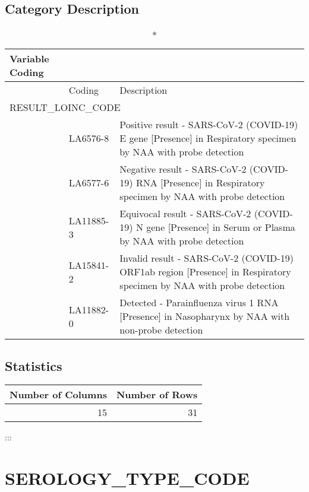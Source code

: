 \documentclass[
  letterpaper,
  DIV=11,
  numbers=noendperiod]{scrreprt}
\begin{document}
\hypertarget{category-description-38}{%
\section*{Category Description}\label{category-description-38}}

\begin{longtable}{l|ll}
\caption*{
{\large Variable Coding}
} \\ 
\toprule
\multicolumn{1}{l}{} & Coding & Description \\ 
\midrule
\multicolumn{3}{l}{RESULT\_LOINC\_CODE} \\ 
\midrule
  & LA6576-8 & Positive result - SARS-CoV-2 (COVID-19) E gene [Presence] in Respiratory specimen by NAA with probe detection \\ 
  & LA6577-6 & Negative result - SARS-CoV-2 (COVID-19) RNA [Presence] in Respiratory specimen by NAA with probe detection \\ 
  & LA11885-3 & Equivocal result - SARS-CoV-2 (COVID-19) N gene [Presence] in Serum or Plasma by NAA with probe detection \\ 
  & LA15841-2 & Invalid result - SARS-CoV-2 (COVID-19) ORF1ab region [Presence] in Respiratory specimen by NAA with probe detection \\ 
  & LA11882-0 & Detected - Parainfluenza virus 1 RNA [Presence] in Nasopharynx by NAA with non-probe detection \\ 
\bottomrule
\end{longtable}

\hypertarget{statistics-38}{%
\section*{Statistics}\label{statistics-38}}

\begin{longtable}{rr}
\toprule
Number of Columns & Number of Rows \\ 
\midrule
15 & 31 \\ 
\bottomrule
\end{longtable}

:::

\hypertarget{serology_type_code}{%
\chapter*{SEROLOGY\_TYPE\_CODE}\label{serology_type_code}}
\end{document}
